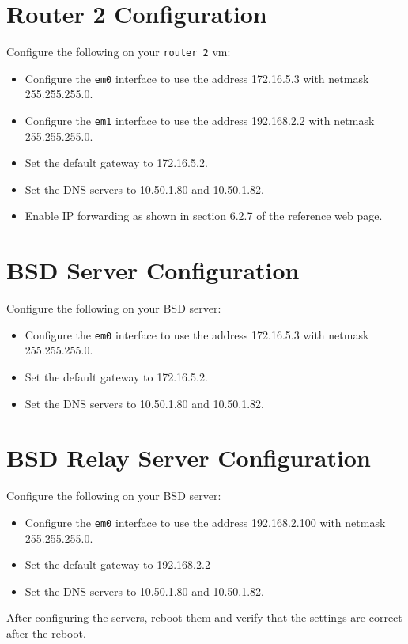 \documentclass{article}
\begin{document}
\section{Router 2 Configuration}
Configure the following on your \texttt{router 2} vm:

\begin{itemize}
	\item Configure the \texttt{em0} interface to use the address 172.16.5.3 with netmask 255.255.255.0.
	\item Configure the \texttt{em1} interface to use the address 192.168.2.2 with netmask 255.255.255.0.
	\item Set the default gateway to 172.16.5.2.
	\item Set the DNS servers to 10.50.1.80 and 10.50.1.82.
	\item Enable IP forwarding as shown in section 6.2.7 of the reference web page.
\end{itemize}

\section{BSD Server Configuration}
Configure the following on your BSD server:

\begin{itemize}
	\item Configure the \texttt{em0} interface to use the address 172.16.5.3 with netmask 255.255.255.0.
	\item Set the default gateway to 172.16.5.2.
	\item Set the DNS servers to 10.50.1.80 and 10.50.1.82.
\end{itemize}

\section{BSD Relay Server Configuration}
Configure the following on your BSD server:

\begin{itemize}
	\item Configure the \texttt{em0} interface to use the address 192.168.2.100 with netmask 255.255.255.0.
	\item Set the default gateway to 192.168.2.2
	\item Set the DNS servers to 10.50.1.80 and 10.50.1.82.
\end{itemize}


After configuring the servers, reboot them and verify that the settings are correct after the reboot.
\end{document}
